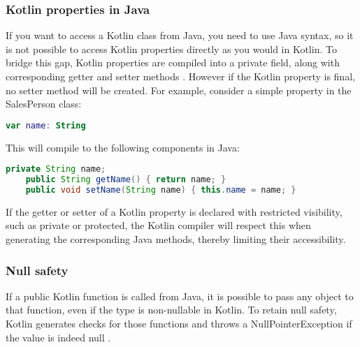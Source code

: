 \documentclass[a4paper, 11pt]{article}
\begin{document}
\subsubsection{Kotlin properties in Java}
  If you want to access a Kotlin class from Java, you need to use Java syntax, so it is not possible to access Kotlin properties directly as you would in Kotlin. To bridge this gap, Kotlin properties are compiled into a private field, along with corresponding getter and setter methods \cite{interop-properties}. However if the Kotlin property is final, no setter method will be created. For example, consider a simple property in the SalesPerson class:
  \begin{lstlisting}[language=Kotlin]
    var name: String
  \end{lstlisting}
  This will compile to the following components in Java:
  \begin{lstlisting}[language=Java]
    private String name;
    public String getName() { return name; }
    public void setName(String name) { this.name = name; }
  \end{lstlisting}
  If the getter or setter of a Kotlin property is declared with restricted visibility, such as private or protected, the Kotlin compiler will respect this when generating the corresponding Java methods, thereby limiting their accessibility.

\subsubsection{Null safety}
  If a public Kotlin function is called from Java, it is possible to pass any object to that function, even if the type is non-nullable in Kotlin. To retain null safety, Kotlin generates checks for those functions and throws a NullPointerException if the value is indeed null \cite{interop-java-null-safety}.
\end{document}
